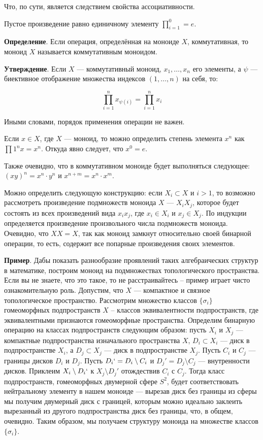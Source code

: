 \documentclass[a4paper]{book}
\begin{document}
Что, по сути, является следствием свойства ассоциативности. 

Пустое произведение равно единичному элементу $\prod\limits_{i=1}^0 = e$.

\textbf{Определение}. Если операция, определённая на моноиде $X$, коммутативная, то моноид $X$ называется коммутативным моноидом. 


\textbf{Утверждение}. Если $X$ — коммутативный моноид, $x_1,\dots,x_n$ его элементы, а $\psi$ — биективное отображение множества индексов $(1,\dots,n)$ на себя, то:

\begin{equation}
	\prod\limits_{i=1}^n x_{\psi(i)} = \prod\limits_{i=1}^n x_{i}
\end{equation}

Иными словами, порядок применения операции не важен. 

Если $x\in X$, где $X$ — моноид, то можно определить степень элемента $x^n$ как $\prod\limits{1}^n x = x^n$. Откуда явно следует, что $x^0 = e$. 

Также очевидно, что в коммутативном моноиде будет выполняться следующее: $(xy)^n = x^n\cdot y^n$ и $x^{n+m} = x^n\cdot x^m$.

Можно определить следующую конструкцию: если $X_i \subset X$ и $i>1$, то возможно рассмотреть произведение подмножеств моноида $X$ — $X_i X_j$, которое будет состоять из всех произведений вида $x_i x_j$, где $x_i \in X_i$ и $x_j \in X_j$. По индукции определяется произведение произвольного числа подмножеств моноида. 
Очевидно, что $XX = X$, так как моноид замкнут относительно своей бинарной операции, то есть, содержит все попарные произведения своих элементов. 

\textbf{Пример}. Дабы показать разнообразие проявлений таких алгебраических структур в математике, построим моноид на подмножествах топологического пространства. Если вы не знаете, что это такое, то не расстраивайтесь – пример играет чисто ознакомительную роль. Допустим, что $X$ — компактное и связное топологическое пространство. Рассмотрим множество классов $\{\sigma_i \}$ гомеоморфных подпространств $X$ – классов эквивалентности подпространств, где эквивалентными признаются гомеоморфные пространства. Определим бинарную операцию на классах подпространств следующим образом: пусть $X_i$ и $X_j$ — компактные подпространства изначального пространства $X$, $D_i \subset X_i$ — диск в подпространстве $X_i$, а $D_j \subset X_j$ — диск в подпространстве $X_j$. Пусть $C_i$ и $C_j$ — границы дисков $D_i$ и $D_j$. Пусть $D_i` = D_i \setminus C_i$ и $D_j' = D_j \setminus C_j$ — внутренности дисков. Приклеим $X_i \setminus D_i`$ к $X_j \setminus D_j'$ отождествив $C_i$ с $C_j$. 
Тогда класс подпространств, гомеоморфных двумерной сфере $S^2$, будет соответствовать нейтральному элементу в нашем моноиде — вырезав диск без границы из сферы мы получим двумерный диск с границей, которым можно идеально заклеить вырезанный из другого подпространства диск без границы, что, в общем, очевидно. Таким образом, мы получаем структуру моноида на множестве классов $\{\sigma_i\}$.  
\end{document}
